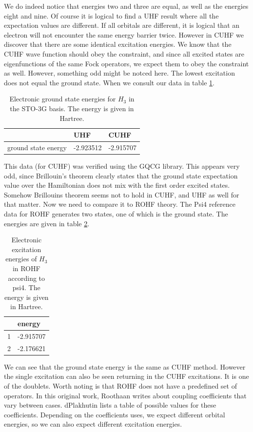 \documentclass[twoside,twocolumn,9pt]{article}
\begin{document}
We do indeed notice that energies two and three are equal, as well as the energies eight and nine. Of course it is logical to find a UHF result where all the expectation values are
different. If all orbitals are different, it is logical that an electron will not encounter the same energy barrier twice. However in CUHF we discover that there are some identical
excitation energies. We know that the CUHF wave function should obey the constraint, and since all excited states are eigenfunctions of the same Fock operators, we expect them to
obey the constraint as well. However, something odd might be notced here. The lowest excitation does not equal the ground state. When we consult our data in table 
\ref{tab:ground states}.
\begin{table}[h]
  \caption{Electronic ground state energies for $H_3$ in the STO-3G basis. The energy is given in Hartree.}
  \label{tab:ground states}
  \begin{tabular}{l|l|l}
                        & UHF       & CUHF      \\
    \hline
    ground state energy & -2.923512 & -2.915707
  \end{tabular}
\end{table}
This data (for CUHF) was verified using the GQCG library. This appears very odd, since Brillouin's theorem clearly states that the ground state expectation value over the Hamiltonian
does not mix with the first order excited states. Somehow Brillouins theorem seems not to hold in CUHF, and UHF as well for that matter. Now we need to compare it to ROHF theory. 
The Psi4 reference data for ROHF generates two states, one of which is the ground state. The energies are given in table \ref{tab:ROHF}.
\begin{table}[h]
  \caption{Electronic excitation energies of $H_3$ in ROHF according to psi4. The energy is given in Hartree.}
  \label{tab:ROHF}
  \begin{tabular}{l|l}
    & energy \\
    \hline
    1 & -2.915707 \\
    2 & -2.176621
  \end{tabular}
\end{table}
We can see that the ground state energy is the same as CUHF method. However the single excitation can also be seen returning in the CUHF excitations. It is one of the doublets.
Worth noting is that ROHF does not have a predefined set of operators. In this original work, Roothaan writes about coupling coefficients that vary between cases\cite{Roothaan1960}.
dPlakhutin lists a table of possible values for these coefficients\cite{Plakhutin2014}. Depending on the coefficients uses, we expect different orbital energies, so we can also
expect different excitation energies.
\end{document}
